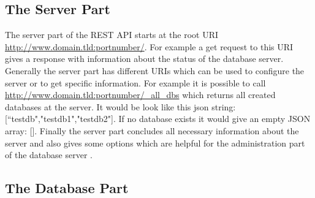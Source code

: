 \subsection{The Server Part}
 
The server part of the REST API starts at the root URI \url{http://www.domain.tld:portnumber/}. For example a get request to this URI gives a response with information about the status of the database server. 
Generally the server part has different URIs which can be used to configure the server or to get specific information. For example it is possible to call \url{http://www.domain.tld:portnumber/_all_dbs} which returns all created databases at the server.
It would be look like this json string: [“testdb","testdb1","testdb2"]. 
If no database exists it would give an empty JSON array: []. 
Finally the server part concludes all necessary information about the server and also gives some options which are helpful for the administration part of the database server \parencite{CouchDBRestServer}.

\subsection{The Database Part}
\label{subsec:TheDatabasePart-1}

